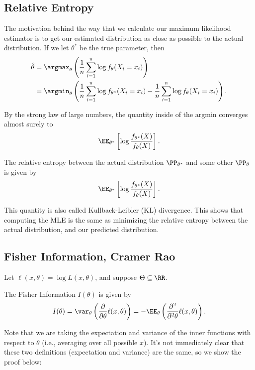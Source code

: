 \subsection{Relative Entropy}

The motivation behind the way that we calculate our maximum likelihood estimator is to get our estimated distribution as close as possible to the actual distribution. If we let $\theta^*$ be the true parameter, then 
\begin{align*}
    \hat{\theta} &= \argmax_{\theta}\left(\frac{1}{n}\sum_{i=1}^n\log f_{\theta}(X_i=x_i)\right) \\
&= \argmin_{\theta}\left(\frac{1}{n}\sum_{i=1}^n\log f_{\theta^*}(X_i=x_i)-\frac{1}{n}\sum_{i=1}^n\log f_{\theta}(X_i=x_i)\right).
\end{align*}

By the strong law of large numbers, the quantity inside of the argmin converges almost surely to 
\[\EE_{\theta^*}\left[\log \frac{f_{\theta^*}(X)}{f_{\theta}(X)}\right].\]

\begin{definition}

The \ac{relative entropy} between the actual distribution $\PP_{\theta^*}$ and some other $\PP_{\theta}$ is given by 
\[\EE_{\theta^*}\left[\log \frac{f_{\theta^*}(X)}{f_{\theta}(X)}\right].\]
\end{definition}

This quantity is also called \ac{Kullback-Leibler (KL) divergence}. This shows that computing the MLE is the same as minimizing the relative entropy between the actual distribution, and our predicted distribution. 

\subsection{Fisher Information, Cramer Rao}

Let $\ell(x, \theta) = \log L(x, \theta)$, and suppose $\Theta\subseteq \RR$. 
\begin{definition}

The \ac{Fisher Information} $I(\theta)$ is given by 
\[I(\theta) = \var_{\theta}\left(\frac{\partial}{\partial \theta}\ell(x, \theta)\right) = -\EE_{\theta}\left(\frac{\partial^2}{\partial^2\theta}\ell(x, \theta)\right).\]
\end{definition}

Note that we are taking the expectation and variance of the inner functions with respect to $\theta$ (i.e., averaging over all possible $x$). It's not immediately clear that these two definitions (expectation and variance) are the same, so we show the proof below:

